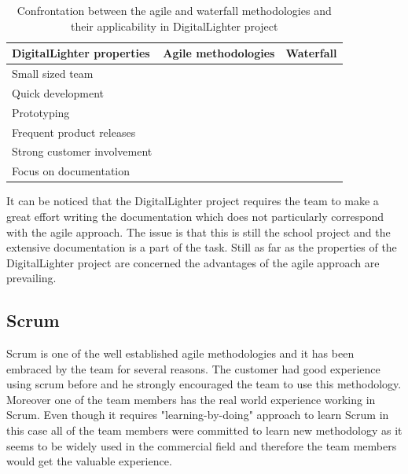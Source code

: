 \begin{table}[htb]
	\begin{center}
	\caption{Confrontation between the agile and waterfall methodologies and their applicability in DigitalLighter project}
	\label{tab:agile_vs_waterfall}
	\def\arraystretch{1.3}
		\begin{tabularx}{0.9\textwidth}{ X c c }
		\toprule[0.5mm]
		\textbf{DigitalLighter properties} & \textbf{Agile methodologies} & \textbf{Waterfall} \\
		\midrule[0.5mm]
		Small sized team 								& \tick  & \tick 	\\
		Quick development				 				& \tick  & \cross 	\\
		Prototyping										& \tick  & \cross 	\\
		Frequent product releases 						& \tick  & \cross 	\\
		Strong customer involvement 					& \tick  & \cross 	\\
		Focus on documentation 							& \cross & \tick  	\\
		\bottomrule[0.5mm]
		\end{tabularx}
	\end{center}
\end{table}

It can be noticed that the DigitalLighter project requires the team to make a great effort writing the documentation which does not particularly correspond with the agile approach. The issue is that this is still the school project and the extensive documentation is a part of the task. Still as far as the properties of the DigitalLighter project are concerned the advantages of the agile approach are prevailing.

\subsection{Scrum} \label{txt:scrum}
Scrum is one of the well established agile methodologies and it has been embraced by the team for several reasons. The customer had good experience using scrum before and he strongly encouraged the team to use this methodology. Moreover one of the team members has the real world experience working in Scrum. Even though it requires "learning-by-doing" approach to learn Scrum in this case all of the  team members were committed to learn new methodology as it seems to be widely used in the commercial field and therefore the team members would get the valuable experience.

